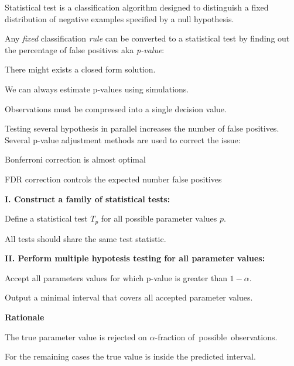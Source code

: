 \documentclass[landscape,footrule]{foils}
\begin{document}

Statistical test is a classification algorithm designed to distinguish a fixed distribution of negative examples specified by a null hypothesis.
\vspace*{2ex}

Any \emph{fixed} classification \emph{rule} can be converted to a statistical test by finding out the percentage of false positives aka \emph{p-value}:
\begin{triangles}
\item There might exists a closed form solution.
\item We can always estimate p-values using simulations. 
\item Observations must be compressed into a single decision value.
\end{triangles}
\vspace*{2ex}

Testing several hypothesis in parallel increases the number of false positives.  
Several p-value adjustment methods are used to correct the issue:
\begin{triangles}
\item Bonferroni correction is almost optimal 
\item FDR correction controls the expected number false positives  
\end{triangles}  
 

 
\textbf{I. Construct a family of statistical tests:}
\begin{triangles}
\item Define a statistical test $T_p$ for all possible parameter values $p$.
\item All tests should share the same test statistic.
\end{triangles}
\vspace*{1cm}

\textbf{II. Perform multiple hypotesis testing for all parameter values:}
\begin{triangles}
\item Accept all parameters values for which p-value is greater than $1-\alpha$.  
\item Output a minimal interval that covers all accepted parameter values.
\end{triangles}
\vspace*{1cm}

\textbf{Rationale}
\begin{triangles}
\item The true parameter value is rejected on $\alpha$-fraction of~possible~observations.
\item For the remaining cases the true value is inside the predicted interval. 
\end{triangles}
\end{document}
